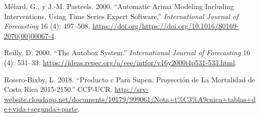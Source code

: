 \documentclass[12pt]{article}
\begin{document}
\leavevmode\hypertarget{ref-melard}{}%
Mélard, G., y J.-M. Pasteels. 2000. ``Automatic Arima Modeling
Including Interventions, Using Time Series Expert Software.''
\emph{International Journal of Forecasting} 16 (4): 497--508.
\url{https://doi.org/https://doi.org/10.1016/S0169-2070(00)00067-4}.

\leavevmode\hypertarget{ref-autobox}{}%
Reilly, D. 2000. ``The Autobox System.'' \emph{International Journal of
Forecasting} 16 (4): 531--33.
\url{https://ideas.repec.org/a/eee/intfor/v16y2000i4p531-533.html}.

\leavevmode\hypertarget{ref-supenprodc}{}%
Rosero-Bixby, L. 2018. ``Producto c Para Supen. Proyección de La
Mortalidad de Costa Rica 2015-2150.'' CCP-UCR.
\url{http://srv-website.cloudapp.net/documents/10179/999061/Nota+t\%C3\%A9cnica+tablas+de+vida+segunda+parte}.
\end{document}
